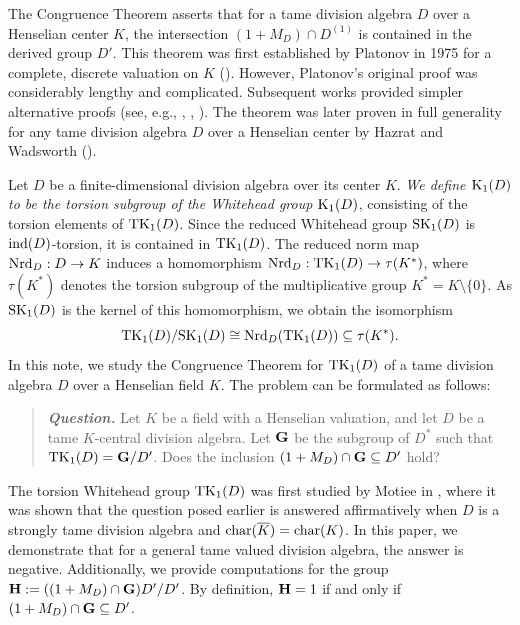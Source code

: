 \documentclass{amsart}
\theoremstyle{definition}
\numberwithin{equation}{section} %
\begin{document}
The Congruence Theorem asserts that for a tame division algebra $D$ over a Henselian center $K$, the intersection $(1 + M_D) \cap D^{(1)}$ is contained in the derived group $D'$. This theorem was first established by Platonov in 1975 for a complete, discrete valuation on $K$ (\cite{platonov-75}). However, Platonov's original proof was considerably lengthy and complicated. Subsequent works provided simpler alternative proofs (see, e.g., \cite{ershow-82}, \cite{hazrat-02}, \cite{suslin-91}). The theorem was later proven in full generality for any tame division algebra $D$ over a Henselian center by Hazrat and Wadsworth (\cite{hazrat-wadsworth-2011}).

Let $D$ be a finite-dimensional division algebra over its center $K$.  \textit{We define ${\rm K}_1(D)$ to be the torsion subgroup of the Whitehead group ${\rm K}_1(D)$}, consisting of the torsion elements of ${\rm TK}_1(D)$. Since the reduced Whitehead group ${\rm SK}_1(D)$ is ${\rm ind}(D)$-torsion, it is contained in ${\rm TK}_1(D)$. The reduced norm map ${\rm Nrd}_D: D \to K$ induces a homomorphism ${\rm Nrd}_D: {\rm TK}_1(D) \to \tau(K^*)$, where $\tau(K^*)$ denotes the torsion subgroup of the multiplicative group $K^* = K \setminus \{0\}$. As ${\rm SK}_1(D)$ is the kernel of this homomorphism, we obtain the isomorphism
\[
{\rm TK}_1(D)/{\rm SK}_1(D) \cong {\rm Nrd}_D({\rm TK}_1(D)) \subseteq \tau(K^*).
\]
In this note, we study the Congruence Theorem for ${\rm TK}_1(D)$ of a tame division algebra $D$ over a Henselian field $K$. The problem can be formulated as follows:

\begin{quote}
\emph{\textbf{Question.}} Let $K$ be a field with a Henselian valuation, and let $D$ be a tame $K$-central division algebra. Let ${\bf G}$ be the subgroup of $D^*$ such that ${\rm TK}_1(D) = {\bf G}/D'$. Does the inclusion $(1 + M_D) \cap {\bf G} \subseteq D'$ hold?
\end{quote}

\medskip 

The torsion Whitehead group ${\rm TK}_1(D)$ was first studied by Motiee in \cite{motiee-13}, where it was shown that the question posed earlier is answered affirmatively when $D$ is a strongly tame division algebra and ${\rm char}(\overline{K}) = {\rm char}(K)$. In this paper, we demonstrate that for a general tame valued division algebra, the answer is negative. Additionally, we provide computations for the group ${\bf H} := ((1 + M_D) \cap {\bf G})D'/D'$. By definition, ${\bf H} = 1$ if and only if $(1 + M_D) \cap {\bf G} \subseteq D'$.
\end{document}
